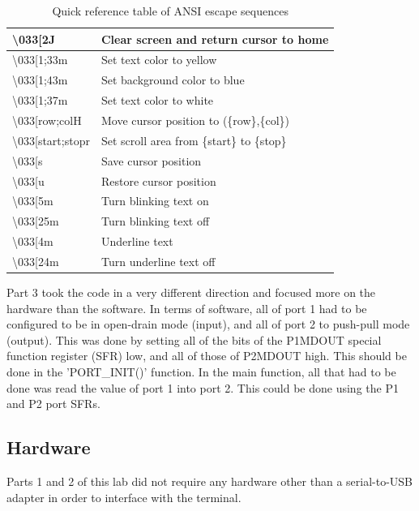 \documentclass[12pt]{article}
\begin{document}
\begin{table}[h]
	\centering
	\begin{tabular}{|l|l|}
		\hline
		\textbackslash033[2J & Clear screen and return cursor to home \\ \hline
		\textbackslash033[1;33m & Set text color to yellow \\ \hline
		\textbackslash033[1;43m & Set background color to blue \\ \hline
		\textbackslash033[1;37m & Set text color to white\\ \hline
		\textbackslash033[{row};{col}H & Move cursor position to (\{row\},\{col\})\\ \hline
		\textbackslash033[{start};{stop}r & Set scroll area from \{start\} to \{stop\}\\ \hline
		\textbackslash033[s & Save cursor position\\ \hline
		\textbackslash033[u & Restore cursor position\\ \hline
		\textbackslash033[5m & Turn blinking text on\\ \hline
		\textbackslash033[25m & Turn blinking text off\\ \hline
		\textbackslash033[4m & Underline text\\ \hline
		\textbackslash033[24m & Turn underline text off\\ \hline		
		\hline
	\end{tabular}
	\caption{Quick reference table of ANSI escape sequences}
	\label{refTable}
\end{table}

Part 3 took the code in a very different direction and focused more on the hardware than the software. In terms of software, all of port 1 had to be configured to be in open-drain mode (input), and all of port 2 to push-pull mode (output). This was done by setting all of the bits of the P1MDOUT special function register (SFR) low, and all of those of P2MDOUT high. This should be done in the 'PORT\_INIT()' function. In the main function, all that had to be done was read the value of port 1 into port 2. This could be done using the P1 and P2 port SFRs. 

\subsection{Hardware}

Parts 1 and 2 of this lab did not require any hardware other than a serial-to-USB adapter in order to interface with the terminal.
\end{document}
